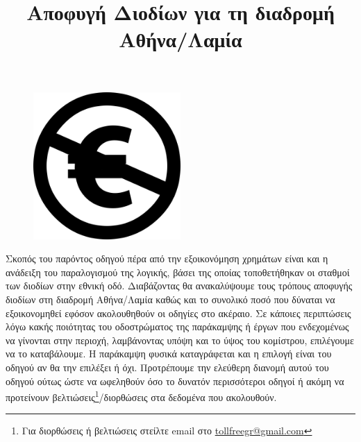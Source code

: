 \documentclass[a4paper,12pt]{article}
\title{\LARGE Αποφυγή Διοδίων για τη διαδρομή Αθήνα/Λαμία}
\date{}
\author{}
\begin{document}
\begin{titlepage}


\maketitle
\begin{figure}[hbp!]
	\centering
		\includegraphics[width=0.5\textwidth]{Nc-eu.svg.png}
\end{figure}
\abstract Σκοπός του παρόντος οδηγού πέρα από την εξοικονόμηση χρημάτων είναι και η ανάδειξη του παραλογισμού της λογικής, βάσει της οποίας τοποθετήθηκαν οι σταθμοί των διοδίων στην εθνική οδό. Διαβάζοντας θα ανακαλύψουμε τους τρόπους αποφυγής διοδίων στη διαδρομή Αθήνα/Λαμία καθώς και το συνολικό ποσό που δύναται να εξοικονομηθεί εφόσον ακολουθηθούν οι οδηγίες στο ακέραιο. Σε κάποιες περιπτώσεις λόγω κακής ποιότητας του οδοστρώματος της παράκαμψης ή έργων που ενδεχομένως να γίνονται στην περιοχή, λαμβάνοντας υπόψη και το ύψος του κομίστρου, επιλέγουμε να το καταβάλουμε. Η παράκαμψη φυσικά καταγράφεται και η επιλογή είναι του οδηγού αν θα την επιλέξει ή όχι. Προτρέπουμε την ελεύθερη διανομή αυτού του οδηγού ούτως ώστε να ωφεληθούν όσο το δυνατόν περισσότεροι οδηγοί ή ακόμη να προτείνουν βελτιώσεις\footnote{Για διορθώσεις ή βελτιώσεις στείλτε email στο \href{mailto:tollfreegr@gmail.com}{tollfreegr@gmail.com}}/διορθώσεις στα δεδομένα που ακολουθούν. 
\thispagestyle{empty}
\end{titlepage}
\tableofcontents
\newpage


\end{document}
